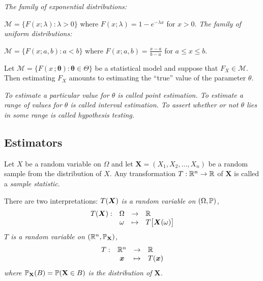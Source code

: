 \begin{example}
\bit
\it
The family of exponential distributions: \par
\qquad $\mathcal{M} = \big\{F(x;\lambda): \lambda>0\big\}$ where $F(x;\lambda)=1-e^{-\lambda x}$ for $x>0$.
\it 
The family of uniform distributions: \par
\qquad$\mathcal{M} = \big\{F(x;a,b): a<b\big\}$ where $F(x;a,b)=\displaystyle\frac{x-a}{b-a}$ for $a\leq x\leq b$.
\eit
\end{example}


\begin{remark}
Let $\mathcal{M}=\big\{F(x\,;\mathbf{\theta}):\mathbf{\theta}\in\Theta\big\}$ be a statistical model and suppose that $F_X\in\mathcal{M}$. Then estimating $F_X$ amounts to estimating the ``true'' value of the parameter $\theta$.
\end{remark}

\begin{definition}
\ben
\it To estimate a particular value for $\theta$ is called \emph{point estimation}.
\it To estimate a range of values for $\theta$ is called \emph{interval estimation}.  
\it To assert whether or not $\theta$ lies in some range is called \emph{hypothesis testing}.
\een
\end{definition}


\subsection{Estimators}


\begin{definition}
Let $X$ be a random variable on $\Omega$ and let $\mathbf{X}=(X_1,X_2,\ldots,X_n)$ be a random sample from the distribution of $X$. Any transformation $T:\mathbb{R}^n\to\mathbb{R}$ of $\mathbf{X}$ is called a \emph{sample statistic}.
\end{definition}

There are two interpretations:
\ben
\it 
$T(\boldsymbol{X})$ is a random variable on $(\Omega,\mathbb{P})$,
\[\begin{array}{rccl}
T(\boldsymbol{X}):	& \Omega 	& \to 		& \mathbb{R} \\
			& \omega	& \mapsto	& T\big[\boldsymbol{X}(\omega)\big]
\end{array}\]
\it
$T$ is a random variable on $(\mathbb{R}^n,\mathbb{P}_{\mathbf{X}})$,
\[\begin{array}{rccl}
T:	& \mathbb{R}^n 		& \to 		& \mathbb{R} \\
	& \boldsymbol{x}	& \mapsto	& T(\boldsymbol{x})
\end{array}\]
where $\mathbb{P}_{\mathbf{X}}(B) = \mathbb{P}(\mathbf{X}\in B)$ is the distribution of $\mathbf{X}$.
\een

